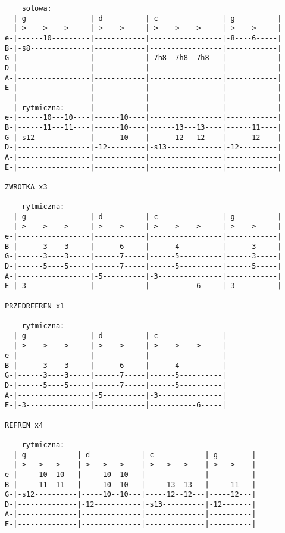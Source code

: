 \begin{verbatim}
    solowa:
  | g               | d          | c               | g          |
  | >    >    >     | >    >     | >    >    >     | >    >     |
e-|------10---------|------------|-----------------|-8----6-----|
B-|-s8--------------|------------|-----------------|------------|
G-|-----------------|------------|-7h8--7h8--7h8---|------------|
D-|-----------------|------------|-----------------|------------|
A-|-----------------|------------|-----------------|------------|
E-|-----------------|------------|-----------------|------------|
  |                 |            |                 |            |
  | rytmiczna:      |            |                 |            |
e-|------10---10----|------10----|-----------------|------------|
B-|------11---11----|------10----|------13---13----|------11----|
G-|-s12-------------|------10----|------12---12----|------12----|
D-|-----------------|-12---------|-s13-------------|-12---------|
A-|-----------------|------------|-----------------|------------|
E-|-----------------|------------|-----------------|------------|

ZWROTKA x3

    rytmiczna:
  | g               | d          | c               | g          |
  | >    >    >     | >    >     | >    >    >     | >    >     |
e-|-----------------|------------|-----------------|------------|
B-|------3----3-----|------6-----|------4----------|------3-----|
G-|------3----3-----|------7-----|------5----------|------3-----|
D-|------5----5-----|------7-----|------5----------|------5-----|
A-|-----------------|-5----------|-3---------------|------------|
E-|-3---------------|------------|-----------6-----|-3----------|

PRZEDREFREN x1

    rytmiczna:
  | g               | d          | c               |
  | >    >    >     | >    >     | >    >    >     |
e-|-----------------|------------|-----------------|
B-|------3----3-----|------6-----|------4----------|
G-|------3----3-----|------7-----|------5----------|
D-|------5----5-----|------7-----|------5----------|
A-|-----------------|-5----------|-3---------------|
E-|-3---------------|------------|-----------6-----|

REFREN x4

    rytmiczna:
  | g            | d            | c            | g        |
  | >   >   >    | >   >   >    | >   >   >    | >   >    |
e-|-----10--10---|-----10--10---|--------------|----------|
B-|-----11--11---|-----10--10---|-----13--13---|-----11---|
G-|-s12----------|-----10--10---|-----12--12---|-----12---|
D-|--------------|-12-----------|-s13----------|-12-------|
A-|--------------|--------------|--------------|----------|
E-|--------------|--------------|--------------|----------|


\end{verbatim}

